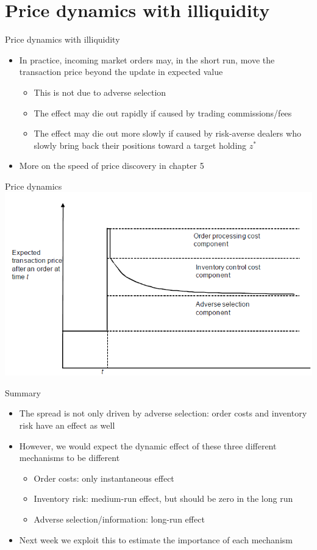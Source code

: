\documentclass[english,10pt
,aspectratio=169
]{beamer}
\begin{document}
\section{Price dynamics with illiquidity}

\begin{frame}{Price dynamics with illiquidity}
	\begin{itemize}
		\item In practice, incoming market orders may, in the short run, move the transaction price beyond the update in expected value
		\begin{itemize}
			\item This is not due to adverse selection
			\item The effect may die out rapidly if caused by trading commissions/fees
			\item The effect may die out more slowly if caused by risk-averse dealers who slowly bring back their positions toward a target holding $z^*$
		\end{itemize}
		\item More on the speed of price discovery in chapter 5
	\end{itemize}
\end{frame}


\begin{frame}{Price dynamics}
	\includegraphics[width=0.85\linewidth]{pics/PriceDiscovery_Image}
\end{frame}


\begin{frame}{Summary}
	\begin{itemize}
		\item The spread is not only driven by adverse selection: order costs and inventory risk have an effect as well
		\item However, we would expect the dynamic effect of these three different mechanisms to be different
		\begin{itemize}
			\item Order costs: only instantaneous effect 
			\item Inventory risk: medium-run effect, but should be zero in the long run
			\item Adverse selection/information: long-run effect 
		\end{itemize}
		\item Next week we exploit this to estimate the importance of each mechanism
	\end{itemize}
\end{frame}
\end{document}
